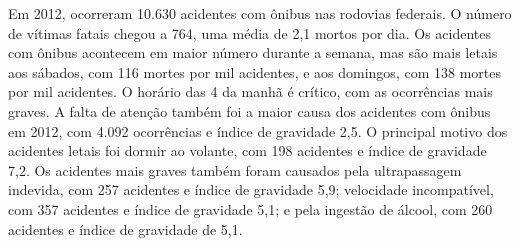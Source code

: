 \begin{enumerate}
   Em 2012, ocorreram 10.630 acidentes com ônibus nas rodovias federais. O número de vítimas fatais chegou a 764, uma média de 2,1 mortos por dia. Os acidentes com ônibus acontecem em maior número durante a semana, mas são mais letais aos sábados, com 116 mortes por mil acidentes, e aos domingos, com 138 mortes por mil acidentes. O horário das 4 da manhã é crítico, com as ocorrências mais graves.
   A falta de atenção também foi a maior causa dos acidentes com ônibus em 2012, com 4.092 ocorrências e índice de gravidade 2,5. O principal motivo dos acidentes letais foi dormir ao volante, com 198 acidentes e índice de gravidade 7,2. Os acidentes mais graves também foram causados pela ultrapassagem indevida, com 257 acidentes e índice de gravidade 5,9; velocidade incompatível, com 357 acidentes e índice de gravidade 5,1; e pela ingestão de álcool, com 260 acidentes e índice de gravidade de 5,1.

 \end{enumerate}
